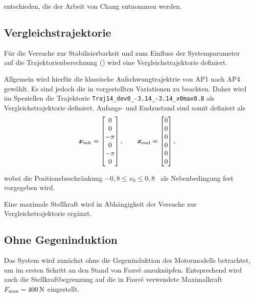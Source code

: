 entschieden, die der Arbeit von Chang \cite{chang} entnommen werden.


   

\subsection{Vergleichstrajektorie}\label{subsec:vglTrj}

Für die Versuche zur Stabilisierbarkeit und zum Einfluss der Systemparameter auf die Trajektorienberechnung () wird eine Vergleichstrajektorie definiert.

Allgemein wird hierfür die klassische Aufschwungtrajektrie von AP1 nach AP4 gewählt. Es sind jedoch die in  vorgestellten Variationen zu beachten. Daher wird im Speziellen die Trajektorie 
\texttt{Traj14\_dev0\_-3.14\_-3.14\_x0max0.8} 
als Vergleichstrajektorie definiert. 
Anfangs- und Endzustand sind somit definiert als
\begin{align*}
	\boldsymbol{x}_{\mathrm{init}} =
	\begin{bmatrix}
		0 \\ 0 \\ -\pi \\ 0 \\ -\pi \\ 0
	\end{bmatrix}	, \qquad
	\boldsymbol{x}_{\mathrm{end}} =
	\begin{bmatrix}
		0 \\ 0 \\ 0 \\ 0 \\ 0 \\ 0
	\end{bmatrix} ,
\end{align*}


wobei die Positionsbeschränkung $-0,8 \leq x_0 \leq 0,8$ \ als Nebenbedingung fest vorgegeben wird.

Eine maximale Stellkraft wird in Abhängigkeit der Versuche zur Vergleichstrajektorie ergänzt.




\subsection{Ohne Gegeninduktion}\label{subsec:ohneInd}

Das System wird zunächst ohne die Gegeninduktion des Motormodells betrachtet, um im ersten Schritt an den Stand von Fauvé \cite{fauve} anzuknüpfen. Entsprechend wird auch die Stellkraftbegrenzung auf die in Fauvé \cite{fauve} verwendete Maximalkraft $F_{\mathrm{max}}=400\,\mathrm{N}$ eingestellt. 

